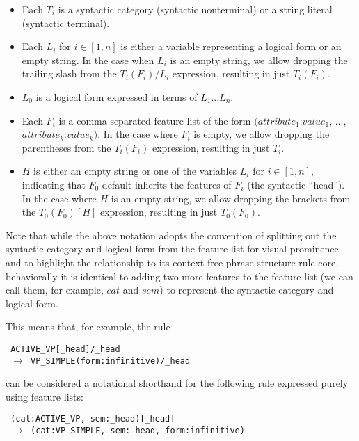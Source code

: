 \documentclass[letterpaper]{article}
\begin{document}
\begin{itemize}
    \item Each $T_{i}$ is a syntactic category (syntactic nonterminal) or a string literal (syntactic terminal).
    \item Each $L_{i}$ for $i \in [1, n]$ is either a variable representing a logical form or an empty string. In the case when $L_{i}$ is an empty string, we allow dropping the trailing slash from the $T_{i}(F_{i})/L_{i}$ expression, resulting in just $T_{i}(F_{i})$.
    \item $L_{0}$ is a logical form expressed in terms of $L_{1}...L_{n}$.
    \item Each $F_{i}$ is a comma-separated feature list of the form $(attribute_{1}$:$value_{1}$, ..., $attribute_{k}$:$value_{k})$. In the case where $F_{i}$ is empty, we allow dropping the parentheses from the $T_{i}(F_{i})$ expression, resulting in just $T_{i}$.
    \item $H$ is either an empty string or one of the variables $L_{i}$ for $i \in [1, n]$, indicating that $F_{0}$ default inherits the features of $F_{i}$ (the syntactic ``head''). In the case where $H$ is an empty string, we allow dropping the brackets from the $T_{0}(F_{0})[H]$ expression, resulting in just $T_{0}(F_{0})$.
\end{itemize}

Note that while the above notation adopts the convention of splitting out the syntactic category and logical form from the feature list for visual prominence and to highlight the relationship to its context-free phrase-structure rule core, behaviorally it is identical to adding two more features to the feature list (we can call them, for example, $cat$ and $sem$) to represent the syntactic category and logical form.

This means that, for example, the rule

\begin{flushleft}
\small{
\texttt{
ACTIVE\_VP[\_head]/\_head \\
~$\rightarrow$ VP\_SIMPLE(form:infinitive)/\_head
}
}
\end{flushleft}

can be considered a notational shorthand for the following rule expressed purely using feature lists:

\begin{flushleft}
\small{
\texttt{
(cat:ACTIVE\_VP, sem:\_head)[\_head] \\
~$\rightarrow$ (cat:VP\_SIMPLE, sem:\_head, form:infinitive)
}
}
\end{flushleft}
\end{document}
